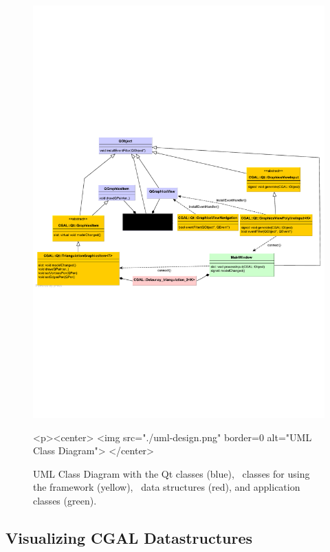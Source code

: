 \begin{figure}[t]
\begin{ccTexOnly}
  \begin{center}
  \includegraphics[width=\linewidth]{GraphicsView/uml-design}
  \end{center}
\end{ccTexOnly}
\begin{ccHtmlOnly}
  <p><center>
  <img src="./uml-design.png" border=0 alt="UML Class Diagram">
  </center>
\end{ccHtmlOnly}
\caption{UML Class Diagram with the Qt classes (blue), \cgal\ classes for using the framework (yellow),
\cgal\ data structures (red), and application classes (green). \label{graphicsview:uml}}
\end{figure}

\subsection{Visualizing CGAL Datastructures}


